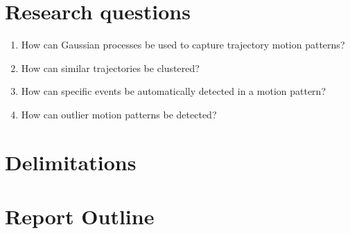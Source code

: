 \section{Research questions}
\label{sec:research-questions}

\begin{enumerate}
\item How can Gaussian processes be used to capture trajectory motion patterns?

\item How can similar trajectories be clustered? 
  
\item How can specific events be automatically detected in a
  motion pattern?

\item How can outlier motion patterns be detected?
\end{enumerate}



\section{Delimitations}
\label{sec:delimitations}


\section{Report Outline}
